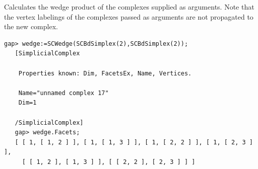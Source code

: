 \documentclass[a4paper,11pt]{report}
\begin{document}
{{{ Calculates the wedge product of the complexes supplied as arguments. Note that
the vertex labelings of the complexes passed as arguments are not propagated
to the new complex. 
\begin{Verbatim}[commandchars=!@|,fontsize=\small,frame=single,label=Example]
   gap> wedge:=SCWedge(SCBdSimplex(2),SCBdSimplex(2));
   [SimplicialComplex
   
    Properties known: Dim, FacetsEx, Name, Vertices.
   
    Name="unnamed complex 17"
    Dim=1
   
   /SimplicialComplex]
   gap> wedge.Facets;
   [ [ 1, [ 1, 2 ] ], [ 1, [ 1, 3 ] ], [ 1, [ 2, 2 ] ], [ 1, [ 2, 3 ] ], 
     [ [ 1, 2 ], [ 1, 3 ] ], [ [ 2, 2 ], [ 2, 3 ] ] ]
   
\end{Verbatim}
 }

 }

 }

 
\end{document}
